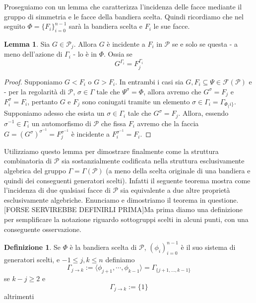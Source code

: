 \documentclass[a4paper,12pt]{report}
\newcommand{\p}{\mathcal{P}}
\theoremstyle{plain}
\theoremstyle{definition}
\newtheorem{defin}[teo]{Definizione}
\newtheorem{lem}[teo]{Lemma}
\newcommand\flag[1]{\mathcal{F}(#1)}
\begin{document}
Proseguiamo con un lemma che caratterizza l'incidenza delle facce mediante il gruppo di simmetria e le facce della bandiera scelta. Quindi ricordiamo che
nel seguito $\Phi=\{F_i\}_{i=0}^{n-1}$ sar\`a la bandiera scelta e $F_i$ le sue facce.
\begin{lem}
\label{lem:IncidenceSelectedFaces}
Sia $G\in\p_j$. Allora $G$ \`e incidente a $F_i$ in $\p$ se e solo se questa - a meno dell'azione di
$\Gamma_i$ - lo \`e in $\Phi$. Ossia se
\begin{equation*}
G^{\Gamma_i}=F_j^{\Gamma_i}
\end{equation*}
\end{lem}
\begin{proof}
Supponiamo $G<F_i$ o $G>F_i$. In entrambi i casi sia ${G,F_i}\subseteq\Psi\in\flag{\p}$ e - per la regolarit\`a di $\p$, $\sigma\in\Gamma$ tale che
$\Psi^\sigma=\Phi$, allora avremo che $G^\sigma=F_j$ e $F_i^\sigma=F_i$, pertanto $G$ e $F_j$ sono coniugati tramite un elemento
$\sigma\in\Gamma_i=\Gamma_{\Phi_\{i\}}$.\\
Supponiamo adesso che esista un $\sigma\in\Gamma_i$ tale che $G^\sigma=F_j$. Allora, essendo $\sigma^{-1}\in\Gamma_i$ un automorfismo di $\p$ che fissa
$F_i$ avremo che la faccia $G=(G^\sigma)^{\sigma^{-1}}=F_j^{\sigma^{-1}}$ \`e incidente a $F_i^{\sigma^{-1}}=F_i$.
\end{proof}
Utilizziamo questo lemma per dimostrare finalmente come la struttura combinatoria di $\p$ sia sostanzialmente codificata nella struttura
esclusivamente algebrica del gruppo $\Gamma=\Gamma(\p)$ (a meno della scelta originale di una bandiera e quindi dei conseguenti generatori scelti).
Infatti il seguente teorema mostra come l'incidenza di due qualsiasi facce di $\p$ sia equivalente a due altre propriet\`a esclusivamente algebriche.
Enunciamo e dimostriamo il teorema in questione. [FORSE SERVIREBBE DEFINIRLI PRIMA]Ma prima diamo una definizione per semplificare la notazione riguardo
sottogruppi scelti in alcuni punti, con una conseguente osservazione.
\begin{defin}
Se $\Phi$ \`e la bandiera scelta di $\p$, $(\phi_i)_{i=0}^{n-1}$ \`e il suo sistema di generatori scelti, e $-1\leq j,k\leq n$ definiamo
\begin{equation*}
\Gamma_{j\rightarrow k}:=\langle\phi_{j+1},\cdots,\phi_{k-1}\rangle=\Gamma_{\{j+1,\dots,k-1\}}
\end{equation*}
se $k-j\geq 2$ e
\begin{equation*}
\Gamma_{j\rightarrow k}:=\{1\}
\end{equation*}
altrimenti
\end{defin}
\end{document}
